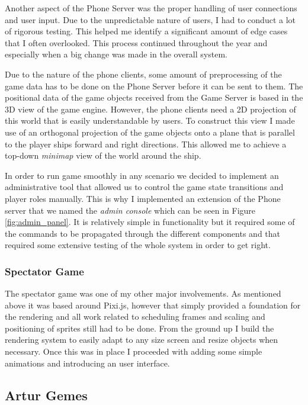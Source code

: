 \documentclass[a4paper,11pt]{article}
\begin{document}
Another aspect of the Phone Server was the proper handling of user connections and user input. Due to the unpredictable nature of users, I had to conduct a lot of rigorous testing. This helped me identify a significant amount of edge cases that I often overlooked. This process continued throughout the year and especially when a big change was made in the overall system.

Due to the nature of the phone clients, some amount of preprocessing of the game data has to be done on the Phone Server before it can be sent to them. The positional data of the game objects received from the Game Server is based in the 3D view of the game engine. However, the phone clients need a 2D projection of this world that is easily understandable by users. To construct this view I made use of an orthogonal projection of the game objects onto a plane that is parallel to the player ships forward and right directions. This allowed me to achieve a top-down \emph{minimap} view of the world around the ship.

In order to run game smoothly in any scenario we decided to implement an administrative tool that allowed us to control the game state transitions and player roles manually. This is why I implemented an extension of the Phone server that we named the \emph{admin console} which can be seen in Figure \ref{fig:admin_panel}. It is relatively simple in functionality but it required some of the commands to be propagated through the different components and that required some extensive testing of the whole system in order to get right.

\subsubsection{Spectator Game}

The spectator game was one of my other major involvements. As mentioned above it was based around Pixi.js, however that simply provided a foundation for the rendering and all work related to scheduling frames and scaling and positioning of sprites still had to be done. From the ground up I build the rendering system to easily adapt to any size screen and resize objects when necessary. Once this was in place I proceeded with adding some simple animations and introducing an user interface.

\clearpage

\subsection{Artur Gemes}
\end{document}
